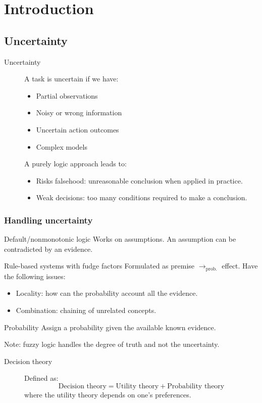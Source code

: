 \chapter{Introduction}


\section{Uncertainty}
\begin{description}
    \item[Uncertainty] 
        A task is uncertain if we have:
        \begin{itemize}
            \item Partial observations
            \item Noisy or wrong information
            \item Uncertain action outcomes
            \item Complex models
        \end{itemize}

        A purely logic approach leads to:
        \begin{itemize}
            \item Risks falsehood: unreasonable conclusion when applied in practice.
            \item Weak decisions: too many conditions required to make a conclusion.
        \end{itemize}
\end{description}


\subsection{Handling uncertainty}
\begin{descriptionlist}
    \item[Default/nonmonotonic logic] 
        Works on assumptions.
        An assumption can be contradicted by an evidence.

    \item[Rule-based systems with fudge factors] 
        Formulated as premise $\rightarrow_\text{prob.}$ effect.
        Have the following issues:
        \begin{itemize}
            \item Locality: how can the probability account all the evidence.
            \item Combination: chaining of unrelated concepts.
        \end{itemize}

    \item[Probability] 
        Assign a probability given the available known evidence.

        Note: fuzzy logic handles the degree of truth and not the uncertainty.
\end{descriptionlist}

\begin{description}
    \item[Decision theory] 
        Defined as:
        \[ \text{Decision theory} = \text{Utility theory} + \text{Probability theory} \]
        where the utility theory depends on one's preferences.
\end{description}